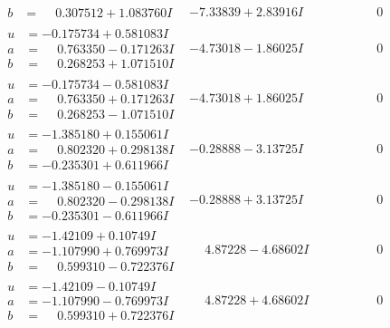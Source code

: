 \documentclass[1p]{elsarticle_modified}
\theoremstyle{definition}
\begin{document}
$$\begin{array}{c|c|c}
\begin{aligned}
b &= \phantom{-}0.307512 + 1.083760 I\end{aligned}
 & -7.33839 + 2.83916 I & \phantom{-0.000000 } 0 \\ \hline\begin{aligned}
u &= -0.175734 + 0.581083 I \\
a &= \phantom{-}0.763350 - 0.171263 I \\
b &= \phantom{-}0.268253 + 1.071510 I\end{aligned}
 & -4.73018 - 1.86025 I & \phantom{-0.000000 } 0 \\ \hline\begin{aligned}
u &= -0.175734 - 0.581083 I \\
a &= \phantom{-}0.763350 + 0.171263 I \\
b &= \phantom{-}0.268253 - 1.071510 I\end{aligned}
 & -4.73018 + 1.86025 I & \phantom{-0.000000 } 0 \\ \hline\begin{aligned}
u &= -1.385180 + 0.155061 I \\
a &= \phantom{-}0.802320 + 0.298138 I \\
b &= -0.235301 + 0.611966 I\end{aligned}
 & -0.28888 - 3.13725 I & \phantom{-0.000000 } 0 \\ \hline\begin{aligned}
u &= -1.385180 - 0.155061 I \\
a &= \phantom{-}0.802320 - 0.298138 I \\
b &= -0.235301 - 0.611966 I\end{aligned}
 & -0.28888 + 3.13725 I & \phantom{-0.000000 } 0 \\ \hline\begin{aligned}
u &= -1.42109 + 0.10749 I \\
a &= -1.107990 + 0.769973 I \\
b &= \phantom{-}0.599310 - 0.722376 I\end{aligned}
 & \phantom{-}4.87228 - 4.68602 I & \phantom{-0.000000 } 0 \\ \hline\begin{aligned}
u &= -1.42109 - 0.10749 I \\
a &= -1.107990 - 0.769973 I \\
b &= \phantom{-}0.599310 + 0.722376 I\end{aligned}
 & \phantom{-}4.87228 + 4.68602 I & \phantom{-0.000000 } 0 \\ \hline\begin{aligned}

\end{aligned}
\end{array}$$
\end{document}
